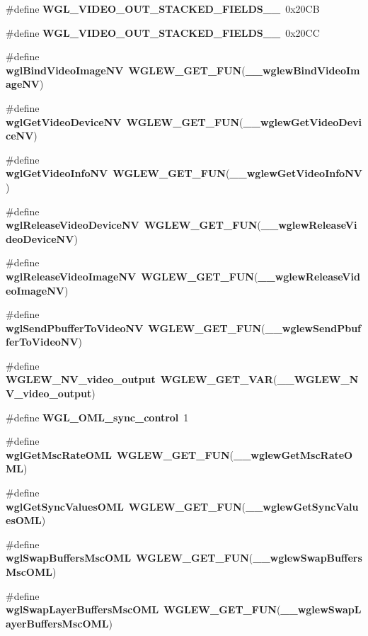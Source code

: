 \begin{DoxyCompactItemize}
\item 
\#define {\bf W\+G\+L\+\_\+\+V\+I\+D\+E\+O\+\_\+\+O\+U\+T\+\_\+\+S\+T\+A\+C\+K\+E\+D\+\_\+\+F\+I\+E\+L\+D\+S\+\_\+\_}~0x20\+CB
\item 
\#define {\bf W\+G\+L\+\_\+\+V\+I\+D\+E\+O\+\_\+\+O\+U\+T\+\_\+\+S\+T\+A\+C\+K\+E\+D\+\_\+\+F\+I\+E\+L\+D\+S\+\_\+\_}~0x20\+CC
\item 
\#define {\bf wgl\+Bind\+Video\+Image\+NV}~{\bf W\+G\+L\+E\+W\+\_\+\+G\+E\+T\+\_\+\+F\+UN}({\bf \+\_\+\+\_\+wglew\+Bind\+Video\+Image\+NV})
\item 
\#define {\bf wgl\+Get\+Video\+Device\+NV}~{\bf W\+G\+L\+E\+W\+\_\+\+G\+E\+T\+\_\+\+F\+UN}({\bf \+\_\+\+\_\+wglew\+Get\+Video\+Device\+NV})
\item 
\#define {\bf wgl\+Get\+Video\+Info\+NV}~{\bf W\+G\+L\+E\+W\+\_\+\+G\+E\+T\+\_\+\+F\+UN}({\bf \+\_\+\+\_\+wglew\+Get\+Video\+Info\+NV})
\item 
\#define {\bf wgl\+Release\+Video\+Device\+NV}~{\bf W\+G\+L\+E\+W\+\_\+\+G\+E\+T\+\_\+\+F\+UN}({\bf \+\_\+\+\_\+wglew\+Release\+Video\+Device\+NV})
\item 
\#define {\bf wgl\+Release\+Video\+Image\+NV}~{\bf W\+G\+L\+E\+W\+\_\+\+G\+E\+T\+\_\+\+F\+UN}({\bf \+\_\+\+\_\+wglew\+Release\+Video\+Image\+NV})
\item 
\#define {\bf wgl\+Send\+Pbuffer\+To\+Video\+NV}~{\bf W\+G\+L\+E\+W\+\_\+\+G\+E\+T\+\_\+\+F\+UN}({\bf \+\_\+\+\_\+wglew\+Send\+Pbuffer\+To\+Video\+NV})
\item 
\#define {\bf W\+G\+L\+E\+W\+\_\+\+N\+V\+\_\+video\+\_\+output}~{\bf W\+G\+L\+E\+W\+\_\+\+G\+E\+T\+\_\+\+V\+AR}({\bf \+\_\+\+\_\+\+W\+G\+L\+E\+W\+\_\+\+N\+V\+\_\+video\+\_\+output})
\item 
\#define {\bf W\+G\+L\+\_\+\+O\+M\+L\+\_\+sync\+\_\+control}~1
\item 
\#define {\bf wgl\+Get\+Msc\+Rate\+O\+ML}~{\bf W\+G\+L\+E\+W\+\_\+\+G\+E\+T\+\_\+\+F\+UN}({\bf \+\_\+\+\_\+wglew\+Get\+Msc\+Rate\+O\+ML})
\item 
\#define {\bf wgl\+Get\+Sync\+Values\+O\+ML}~{\bf W\+G\+L\+E\+W\+\_\+\+G\+E\+T\+\_\+\+F\+UN}({\bf \+\_\+\+\_\+wglew\+Get\+Sync\+Values\+O\+ML})
\item 
\#define {\bf wgl\+Swap\+Buffers\+Msc\+O\+ML}~{\bf W\+G\+L\+E\+W\+\_\+\+G\+E\+T\+\_\+\+F\+UN}({\bf \+\_\+\+\_\+wglew\+Swap\+Buffers\+Msc\+O\+ML})
\item 
\#define {\bf wgl\+Swap\+Layer\+Buffers\+Msc\+O\+ML}~{\bf W\+G\+L\+E\+W\+\_\+\+G\+E\+T\+\_\+\+F\+UN}({\bf \+\_\+\+\_\+wglew\+Swap\+Layer\+Buffers\+Msc\+O\+ML})

\end{DoxyCompactItemize}
